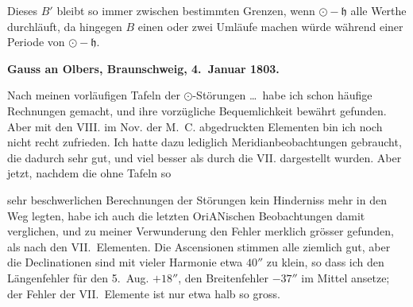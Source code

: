 \documentclass[12pt,a4paper]{article}
\newcommand{\Ceres}{\odot}
\newcommand{\Jupiter}{\mathfrak{h}}
\begin{document}
Dieses $B'$ bleibt so immer zwischen bestimmten Grenzen, wenn $\Ceres - \Jupiter$ alle Werthe durchläuft, da hingegen $B$ einen oder zwei Umläufe machen würde während einer Periode von $\Ceres - \Jupiter$.

\medskip\noindent
\textbf{Gauss an Olbers, Braunschweig, 4.~Januar 1803.}

Nach meinen vorläufigen Tafeln der $\Ceres$-Störungen \ldots\ habe ich schon häufige Rechnungen gemacht, und ihre vorzügliche Bequemlichkeit bewährt gefunden. Aber mit den VIII. im Nov. der M.~C. abgedruckten Elementen bin ich noch nicht recht zufrieden. Ich hatte dazu lediglich Meridianbeobachtungen gebraucht, die dadurch sehr gut, und viel besser als durch die VII. dargestellt wurden. Aber jetzt, nachdem die ohne Tafeln so

\newpage
\setcounter{page}{408}
%
sehr beschwerlichen Berechnungen der Störungen kein Hinderniss mehr in den Weg legten, habe ich auch die letzten OriANischen Beobachtungen damit verglichen, und zu meiner Verwunderung den Fehler merklich grösser gefunden, als nach den VII.~Elementen. Die Ascensionen stimmen alle ziemlich gut, aber die Declinationen sind mit vieler Harmonie etwa $40''$ zu klein, so dass ich den Längenfehler für den 5.~Aug. $+18''$, den Breitenfehler $-37''$ im Mittel ansetze; der Fehler der VII.~Elemente ist nur etwa halb so gross.
\end{document}
